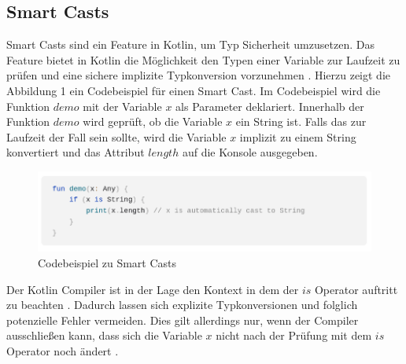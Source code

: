 \documentclass{article}
\begin{document}
\subsection{Smart Casts}
Smart Casts sind ein Feature in Kotlin, um Typ Sicherheit umzusetzen. Das Feature bietet in Kotlin die Möglichkeit den Typen einer Variable zur Laufzeit zu prüfen und eine sichere implizite Typkonversion vorzunehmen \cite{KotlinLangDoc}. Hierzu zeigt die Abbildung 1 ein Codebeispiel für einen Smart Cast. Im Codebeispiel wird die Funktion $demo$ mit der Variable $x$ als Parameter deklariert. Innerhalb der Funktion $demo$ wird geprüft, ob die Variable $x$ ein String ist. Falls das zur Laufzeit der Fall sein sollte, wird die Variable $x$ implizit zu einem String konvertiert und das Attribut $length$ auf die Konsole ausgegeben.
\begin{figure}[!htb]
    \centering
    \includegraphics[width=\linewidth]{img/SmartCast.png}
    \caption{Codebeispiel zu Smart Casts\footnotemark}
\end{figure}
Der Kotlin Compiler ist in der Lage den Kontext in dem der $is$ Operator auftritt zu beachten \cite{KotlinLangDoc}. Dadurch lassen sich explizite Typkonversionen und folglich potenzielle Fehler vermeiden. Dies gilt allerdings nur, wenn der Compiler ausschließen kann, dass sich die Variable $x$ nicht nach der Prüfung mit dem $is$ Operator noch ändert \cite{KotlinLangDoc}.
\end{document}
